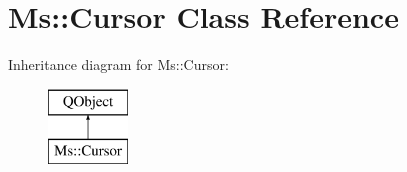 \hypertarget{class_ms_1_1_cursor}{}\section{Ms\+:\+:Cursor Class Reference}
\label{class_ms_1_1_cursor}
Inheritance diagram for Ms\+:\+:Cursor\+:\begin{figure}[H]
\begin{center}
\leavevmode
\includegraphics[height=2.000000cm]{class_ms_1_1_cursor}
\end{center}
\end{figure}
